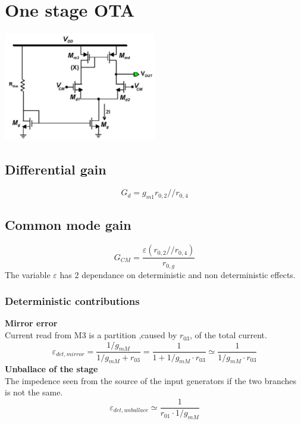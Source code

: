 \chapter{One stage OTA}

\centering
\includegraphics[width=0.5\textwidth]{OTA1.png}\\
\raggedright

\section{Differential gain}
\begin{equation}
G_d=g_{m1}r_{0,2}//r_{0,4}
\end{equation}

\section{Common mode gain}
\begin{equation}
G_{CM}=\frac{\varepsilon(r_{0,2}//r_{0,4})}{r_{0,g}}
\end{equation}
The variable $\varepsilon$ has 2 dependance on deterministic and non deterministic effects.

\subsection{Deterministic contributions}
{\bf Mirror error}\\
Current read from M3 is a partition ,caused by $r_03$, of the total current.
\begin{equation}
\varepsilon_{det,mirror}=\frac{1/g_{mM}}{1/g_{mM}+r_{03}}=\frac{1}{1+1/g_{mM}\cdot r_{03}}\simeq \frac{1}{1/g_{mM}\cdot r_{03}}
\end{equation}
{\bf Unballace of the stage}\\
The impedence seen from the source of the input generators if the two branches is not the same.
\begin{equation}
\varepsilon_{det,unballace}\simeq \frac{1}{r_{01}\cdot 1/g_{mM}}
\end{equation}

